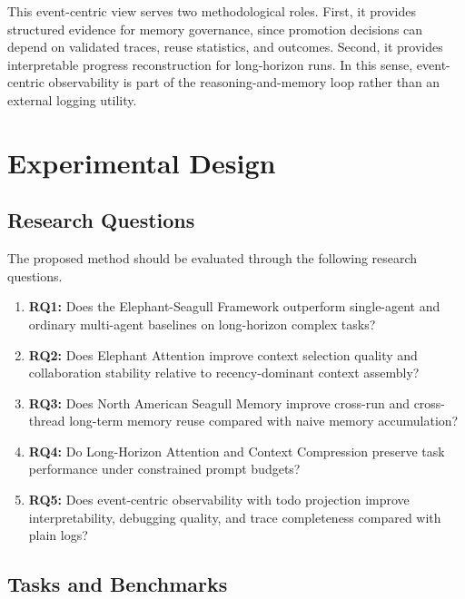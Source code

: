 \documentclass[a4paper,fleqn]{cas-sc}
\begin{document}
This event-centric view serves two methodological roles. First, it provides structured evidence for memory governance, since promotion decisions can depend on validated traces, reuse statistics, and outcomes. Second, it provides interpretable progress reconstruction for long-horizon runs. In this sense, event-centric observability is part of the reasoning-and-memory loop rather than an external logging utility.

\section{Experimental Design}

\subsection{Research Questions}

The proposed method should be evaluated through the following research questions.
\begin{enumerate}
\item \textbf{RQ1:} Does the Elephant-Seagull Framework outperform single-agent and ordinary multi-agent baselines on long-horizon complex tasks?
\item \textbf{RQ2:} Does Elephant Attention improve context selection quality and collaboration stability relative to recency-dominant context assembly?
\item \textbf{RQ3:} Does North American Seagull Memory improve cross-run and cross-thread long-term memory reuse compared with naive memory accumulation?
\item \textbf{RQ4:} Do Long-Horizon Attention and Context Compression preserve task performance under constrained prompt budgets?
\item \textbf{RQ5:} Does event-centric observability with todo projection improve interpretability, debugging quality, and trace completeness compared with plain logs?
\end{enumerate}

\subsection{Tasks and Benchmarks}
\end{document}
